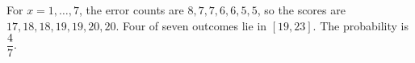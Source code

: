 For $x=1,\ldots,7$, the error counts are $8,7,7,6,6,5,5$, so the scores are $17,18,18,19,19,20,20$. Four of seven outcomes lie in $[19,23]$. The probability is $\boxed{\dfrac{4}{7}}$.
